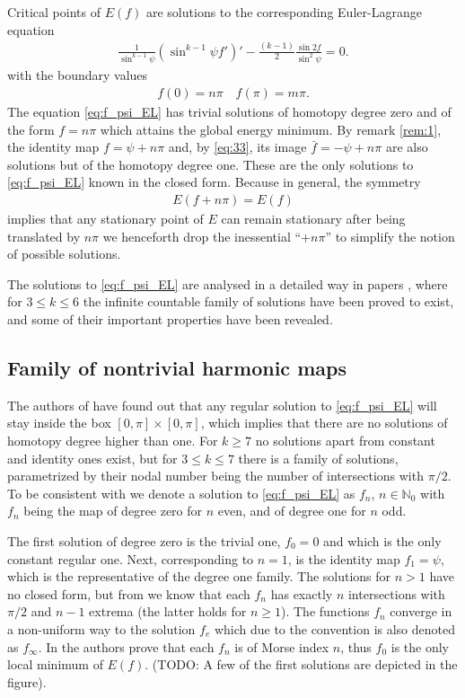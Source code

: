 Critical points of $E(f)$ are solutions to the corresponding
Euler-Lagrange equation
\begin{align}
  \label{eq:f_psi_EL}
  \frac{1}{\sin^{k-1}\psi}\left(\sin^{k-1}\psi f'\right)'-\frac{(k-1)}{2}\frac{\sin2f}{\sin^2\psi}=0.
\end{align}
with the boundary values
\begin{align}
  \label{eq:32}
  f(0)=n\pi\quad f(\pi)=m\pi.
\end{align}
The equation \eqref{eq:f_psi_EL} has trivial solutions of homotopy
degree zero and of the form $f=n\pi$ which attains the global energy
minimum. By remark \ref{rem:1}, the identity map $f=\psi+n\pi$ and, by
\eqref{eq:33}, its image $\bar{f}=-\psi+n\pi$ are also solutions but
of the homotopy degree one. These are the only solutions to
\eqref{eq:f_psi_EL} known in the closed form. Because in general, the
symmetry
\begin{align}
  \label{eq:2}
  E(f+n\pi)=E(f)
\end{align}
implies that any stationary point of $E$ can remain stationary after
being translated by $n\pi$ we henceforth drop the inessential
``$+n\pi$'' to simplify the notion of possible solutions.

The solutions to \eqref{eq:f_psi_EL} are analysed in a detailed way in
papers \cite{Corlette2001,Bizon1997}, where for $3\le k\le6$ the
infinite countable family of solutions have been proved to exist, and
some of their important properties have been revealed.\\

\subsection{Family of nontrivial harmonic maps}
\label{sec:solution-family}

The authors of \cite{Bizon1997} have found out that any regular
solution to \eqref{eq:f_psi_EL} will stay inside the box
$[0,\pi]\times[0,\pi]$, which implies that there are no solutions of
homotopy degree higher than one. For $k\ge7$ no solutions apart from
constant and identity ones exist, but for $3\le k\le 7$ there is a
family of solutions, parametrized by their nodal number being the
number of intersections with $\pi/2$. To be consistent with
\cite{Bizon1997} we denote a solution to \eqref{eq:f_psi_EL} as $f_n$,
$n\in\mathbb{N}_0$ with $f_n$ being the map of degree zero for $n$
even, and of degree one for $n$ odd.

The first solution of degree zero is the trivial one, $f_0=0$ and
which is the only constant regular one. Next, corresponding to $n=1$,
is the identity map $f_1=\psi$, which is the representative of the
degree one family. The solutions for $n>1$ have no closed form, but
from \cite{Bizon1997} we know that each $f_n$ has exactly $n$
intersections with $\pi/2$ and $n-1$ extrema (the latter holds for
$n\ge1$). The functions $f_n$ converge in a non-uniform way to the
solution $f_e$ which due to the convention is also denoted as
$f_\infty$. In \cite{Corlette2001} the authors prove that each $f_n$
is of Morse index $n$, thus $f_0$ is the only local minimum of
$E(f)$. (TODO: A few of the first solutions are depicted in the
figure).


